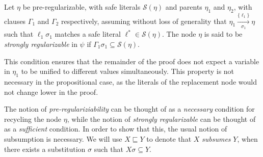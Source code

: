 \begin{definition} %
\label{prop:extracheck}
Let $\eta$ be pre-regularizable, with safe literals $\mathcal{S}(\eta)$ and parents $\eta_1$ and $\eta_2$, with clauses $\Gamma_1$ and $\Gamma_2$ respectively, assuming without loss of generality that $\eta_1 \xrightarrow[\sigma_1]{\{\ell_1\} } \eta$
such that $\ell_1\sigma_1$ matches a safe literal $\ell^*\in \mathcal{S}(\eta)$. 
The node $\eta$ is said to be \emph{strongly regularizable} in $\psi$ if $\Gamma_1 \sigma_{1} \subseteq \mathcal{S}(\eta)$.
\end{definition}

This condition ensures that the remainder of the proof does not expect a variable in $\eta_1$ to be unified to different values simultaneously. This property is not necessary in the propositional case, as the literals of the replacement node would not change lower in the proof. 



The notion of \emph{pre-regulariziability} can be thought of as a \emph{necessary} condition for recycling the node $\eta$, while the notion of \emph{strongly regularizable} can be thought of as a \emph{sufficient} condition. In order to show that this, the usual notion of subsumption is necessary. We will use $X \sqsubseteq Y$ to denote that $X$ \emph{subsumes} $Y$, when there exists a substitution $\sigma$ such that $X\sigma \subseteq Y$.


